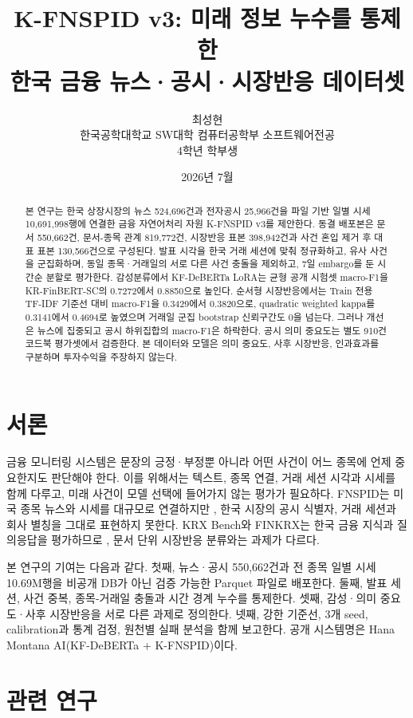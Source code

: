 \documentclass[10pt,a4paper,twocolumn]{article}
\title{K-FNSPID v3: 미래 정보 누수를 통제한\\한국 금융 뉴스·공시·시장반응 데이터셋}
\author{최성현\\
한국공학대학교 SW대학 컴퓨터공학부 소프트웨어전공\\
4학년 학부생}
\date{2026년 7월}
\newcommand{\dataset}{K-FNSPID v3}
\newcommand{\system}{Hana Montana AI(KF-DeBERTa + K-FNSPID)}
\newcommand{\model}{KF-DeBERTa}
\begin{document}
\maketitle

\begin{abstract}
본 연구는 한국 상장시장의 뉴스 524,696건과 전자공시 25,966건을 파일 기반 일별 시세 10,691,998행에 연결한 금융 자연어처리 자원 \dataset{}를 제안한다. 동결 배포본은 문서 550,662건, 문서-종목 관계 819,772건, 시장반응 표본 398,942건과 사건 혼입 제거 후 대표 표본 130,566건으로 구성된다. 발표 시각을 한국 거래 세션에 맞춰 정규화하고, 유사 사건을 군집화하며, 동일 종목·거래일의 서로 다른 사건 충돌을 제외하고, 7일 embargo를 둔 시간순 분할로 평가한다. 감성분류에서 \model{} LoRA는 균형 공개 시험셋 macro-F1을 KR-FinBERT-SC의 0.7272에서 0.8850으로 높인다. 순서형 시장반응에서는 Train 전용 TF-IDF 기준선 대비 macro-F1을 0.3429에서 0.3820으로, quadratic weighted kappa를 0.3141에서 0.4694로 높였으며 거래일 군집 bootstrap 신뢰구간도 0을 넘는다. 그러나 개선은 뉴스에 집중되고 공시 하위집합의 macro-F1은 하락한다. 공시 의미 중요도는 별도 910건 코드북 평가셋에서 검증한다. 본 데이터와 모델은 의미 중요도, 사후 시장반응, 인과효과를 구분하며 투자수익을 주장하지 않는다.
\end{abstract}

\section{서론}

금융 모니터링 시스템은 문장의 긍정·부정뿐 아니라 어떤 사건이 어느 종목에 언제 중요한지도 판단해야 한다. 이를 위해서는 텍스트, 종목 연결, 거래 세션 시각과 시세를 함께 다루고, 미래 사건이 모델 선택에 들어가지 않는 평가가 필요하다. FNSPID는 미국 종목 뉴스와 시세를 대규모로 연결하지만 \cite{dong-etal-2024-fnspid}, 한국 시장의 공시 식별자, 거래 세션과 회사 별칭을 그대로 표현하지 못한다. KRX Bench와 FINKRX는 한국 금융 지식과 질의응답을 평가하므로 \cite{son-etal-2024-krx,son-etal-2025-finkrx}, 문서 단위 시장반응 분류와는 과제가 다르다.

본 연구의 기여는 다음과 같다. 첫째, 뉴스·공시 550,662건과 전 종목 일별 시세 10.69M행을 비공개 DB가 아닌 검증 가능한 Parquet 파일로 배포한다. 둘째, 발표 세션, 사건 중복, 종목-거래일 충돌과 시간 경계 누수를 통제한다. 셋째, 감성·의미 중요도·사후 시장반응을 서로 다른 과제로 정의한다. 넷째, 강한 기준선, 3개 seed, calibration과 통계 검정, 원천별 실패 분석을 함께 보고한다. 공개 시스템명은 \system{}이다.

\section{관련 연구}
\end{document}
